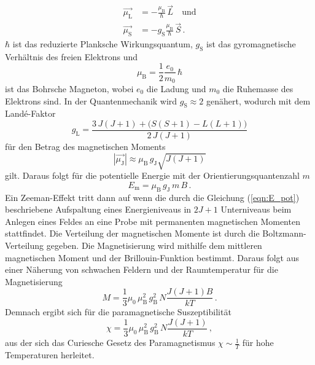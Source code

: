 \begin{align}
    \vec{\mu _{\text{L}}} &= - \frac{\mu_{\text{B}}}{\hbar}\,\vec{L}\quad\text{und} \label{eqn:magnetischerMommentDrehimpuls} \\
    \vec{\mu _ {\text{S}}} &= -g_{\text{S}}\frac{\mu_{\text{B}}}{\hbar}\,\vec{S}\,. \label{eqn:magnetischerMomentSpin}
\end{align}
$\hbar$ ist das reduzierte Planksche Wirkungsquantum, $g_{\text{S}}$ ist das gyromagnetische Verhältnis des freien Elektrons und 
\begin{equation}
    \mu _{\text{B}} = \frac{1}{2} \frac{e_0}{m_0}\,\hbar
    \label{eqn:BohrscheMagneton}
\end{equation}
ist das Bohrsche Magneton, wobei $e_0$ die Ladung und $m_0$ die Ruhemasse des Elektrons sind. 
In der Quantenmechanik wird $g_{\text{S}} \approx 2$ genähert, wodurch mit dem Landé-Faktor
\begin{equation}
    g_{\text{L}} = \frac{3\,J \left(J+1\right) + \big(S\left(S +1\right) -L\left(L+1\right)\big)}{2\,J\left(J+1\right)} 
    \label{eqn:LandeFaktor}
\end{equation}
für den Betrag des magnetischen Moments 
\begin{equation}
    \left|\vec{\mu_{\text{J}}}\right| \approx \mu_{\text{B}}\,g_{\text{J}}\sqrt{J\left(J+1\right)}
    \label{eqn:magnetischerMoment}
\end{equation}
gilt. Daraus folgt für die potentielle Energie mit der Orientierungsquantenzahl $m$
\begin{equation}
    E_{\text{m}} = \mu_{\text{B}}\,g_{\text{J}}\, m\, B\,. 
    \label{eqn:E_pot}
\end{equation}
Ein Zeeman-Effekt tritt dann auf wenn die durch die Gleichung (\ref{eqn:E_pot}) beschriebene Aufspaltung eines Energieniveaus
in $2J+1$ Unterniveaus beim Anlegen eines Feldes an eine Probe mit permanenten magnetischen Momenten stattfindet.
Die Verteilung der magnetischen Momente ist durch die Boltzmann-Verteilung gegeben. Die Magnetisierung wird mithilfe dem mittleren magnetischen 
Moment und der Brillouin-Funktion bestimmt. Daraus folgt aus einer Näherung von schwachen Feldern und der Raumtemperatur für die Magnetisierung
\begin{equation}
    M = \frac{1}{3}\mu _0\,\mu_{\text{B}}^2\,g_{\text{B}}^2\,N \frac{J(J+1)B}{kT}\,.
    \label{eqn:Magnetisierung_Naeherung}
\end{equation}
Demnach ergibt sich für die paramagnetische Suszeptibilität 
\begin{equation}
    \chi = \frac{1}{3}\mu _0\,\mu_{\text{B}}^2\,g_{\text{B}}^2\,N \frac{J(J+1)}{kT}\,,
    \label{eqn:paramagnetische_Suszeptibilität}
\end{equation}
aus der sich das Curiesche Gesetz des Paramagnetismus $\chi \sim \frac{1}{T}$ für hohe Temperaturen herleitet.

